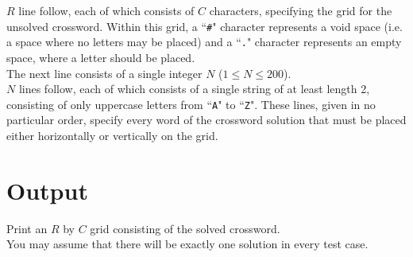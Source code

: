 \noindent $R$ line follow, each of which consists of $C$ characters, specifying the grid for the unsolved crossword. Within this grid, a ``\texttt{\#}" character represents a void space (i.e. a space where no letters may be placed) and a ``\texttt{.}" character represents an empty space, where a letter should be placed.\\

\noindent The next line consists of a single integer $N$ ($1 \leq N \leq 200$).\\

\noindent $N$ lines follow, each of which consists of a single string of at least length 2, consisting of only uppercase letters from ``\texttt{A}" to ``\texttt{Z}". These lines, given in no particular order, specify every word of the crossword solution that must be placed either horizontally or vertically on the grid.

\section*{Output}
Print an $R$ by $C$ grid consisting of the solved crossword.\\
You may assume that there will be exactly one solution in every test case.\\
